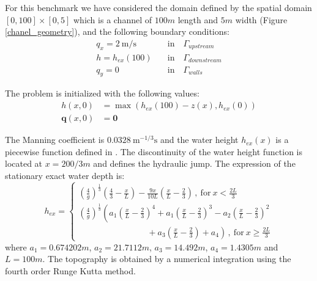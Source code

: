 For this benchmark we have considered the domain defined by the spatial domain $[0,100]\times[0,5]$ which is a channel of $100m$ length and $5m$ width (Figure \ref{chanel_geometry}), and the following boundary conditions:
\begin{equation}
\begin{split}
    q_x = 2\ \text{m/s} \quad &\text{in} \quad \Gamma_{upstream} \\
    h = h_{ex}(100) \quad &\text{in} \quad \Gamma_{downstream} \\
    q_y = 0 \quad &\text{in} \quad \Gamma_{walls}
\end{split}
\end{equation}

The problem is initialized with the following values:
\begin{equation}
\begin{split}
    h(x,0) &= \max(h_{ex}(100) - z(x), h_{ex}(0)) \\
    \mathbf{q}(x,0) &= \mathbf{0}
\end{split}
\end{equation}


The Manning coefficient is $0.0328\ \text{m}^{-1/3}\text{s}$ and the water height $h_{ex}(x)$ is a piecewise function defined in \cite{delestre2013}. The discontinuity of the water height function is located at $x=200/3m$ and defines the hydraulic jump. The expression of the stationary exact water depth is:
\begin{equation} \label{jump_height_definition}
    h_{ex} = \begin{cases}
        \left(\frac{4}{g}\right)^\frac{1}{3} \left(\frac{4}{3} - \frac{x}{L}\right) - \frac{9x}{10L}
            \left(\frac{x}{L} - \frac{2}{3}\right) \, ,\ \text{for} \ x < \frac{2L}{3}\\
        \left(\frac{4}{g}\right)^\frac{1}{3} \left(
              a_1 \left(\frac{x}{L} - \frac{2}{3}\right)^4
            + a_1 \left(\frac{x}{L} - \frac{2}{3}\right)^3
            - a_2 \left(\frac{x}{L} - \frac{2}{3}\right)^2 \right. \\ \left. \qquad\qquad\qquad\qquad
            + a_3 \left(\frac{x}{L} - \frac{2}{3}\right)
            + a_4
        \right) \, ,\ \text{for} \ x \geq \frac{2L}{3}
    \end{cases}
\end{equation}
where $a_1=0.674202m$, $a_2=21.7112m$, $a_3=14.492m$, $a_4=1.4305m$ and $L=100m$. The topography is obtained by a numerical integration using the fourth order Runge Kutta method.

